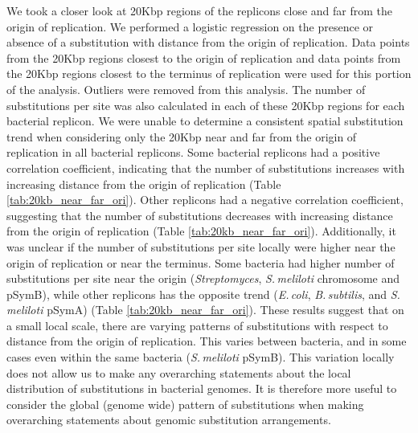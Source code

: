 \documentclass[11pt]{article}
\newcommand{\smel}{\textit{S.\,meliloti}\xspace}
\newcommand{\strep}{\textit{Streptomyces}\xspace}
\newcommand{\ecol}{\textit{E.\,coli}\xspace}
\newcommand{\bass}{\textit{B.\,subtilis}\xspace}
\newcommand{\pa}{pSymA\xspace}
\newcommand{\pb}{pSymB\xspace}
\providecommand{\DIFaddend}{} %
\begin{document}
\DIFaddend We took a closer look at 20Kbp regions of the replicons close and far from the origin of replication.
We performed a logistic regression on the presence or absence of a substitution with distance from the origin of replication.
Data points from the 20Kbp regions closest to the origin of replication and data points from the 20Kbp regions closest to the terminus of replication were used for this portion of the analysis.
Outliers were removed from this analysis.
The number of substitutions per site was also calculated in each of these 20Kbp regions for each bacterial replicon.
We were unable to determine a consistent spatial substitution trend when considering only the 20Kbp near and far from the origin of replication in all bacterial replicons.
Some bacterial replicons had a positive correlation coefficient, indicating that the number of substitutions increases with increasing distance from the origin of replication (Table \ref{tab:20kb_near_far_ori}).
Other replicons had a negative correlation coefficient, suggesting that the number of substitutions decreases with increasing distance from the origin of replication (Table \ref{tab:20kb_near_far_ori}).
Additionally, it was unclear if the number of substitutions per site locally were higher near the origin of replication or near the terminus.
Some bacteria had higher number of substitutions per site near the origin (\strep, \smel chromosome and \pb), while other replicons has the opposite trend (\ecol, \bass, and \smel \pa) (Table \ref{tab:20kb_near_far_ori}).
These results suggest that on a small local scale, there are varying patterns of substitutions with respect to distance from the origin of replication.
This varies between bacteria, and in some cases even within the same bacteria (\smel \pb).
This variation locally does not allow us to make any overarching statements about the local distribution of substitutions in bacterial genomes.
It is therefore more useful to consider the global (genome wide) pattern of substitutions when making overarching statements about genomic substitution arrangements.
\end{document}
